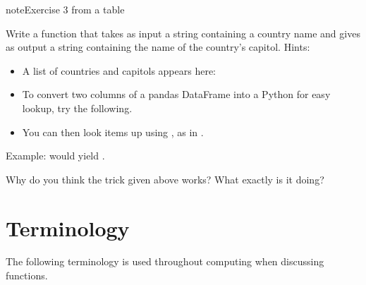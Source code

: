 \documentclass[letterpaper,10pt,english]{sphinxmanual}
\begin{document}
\begin{sphinxadmonition}{note}{Exercise 3 \sphinxhyphen{} from a table}

Write a function  that takes as input a string containing a country name and gives as output a string containing the name of the country’s capitol.  Hints:
\begin{itemize}
\item {} 
A list of countries and capitols appears here: 

\item {} 
To convert two columns of a pandas DataFrame into a Python  for easy lookup, try the following.

\end{itemize}

\begin{sphinxVerbatim}[commandchars=\\\{\}]
    \PYG{p}{[}\PYG{p}{]} \PYG{p}{[}\PYG{p}{]}  
\end{sphinxVerbatim}
\begin{itemize}
\item {} 
You can then look items up using , as in .

\end{itemize}

Example:  would yield .
\end{sphinxadmonition}

Why do you think the  trick given above works?  What exactly is it doing?


\section{Terminology}
\label{\detokenize{chapter-2-mathematical-foundations:terminology}}
The following terminology is used throughout computing when discussing functions.
\end{document}
